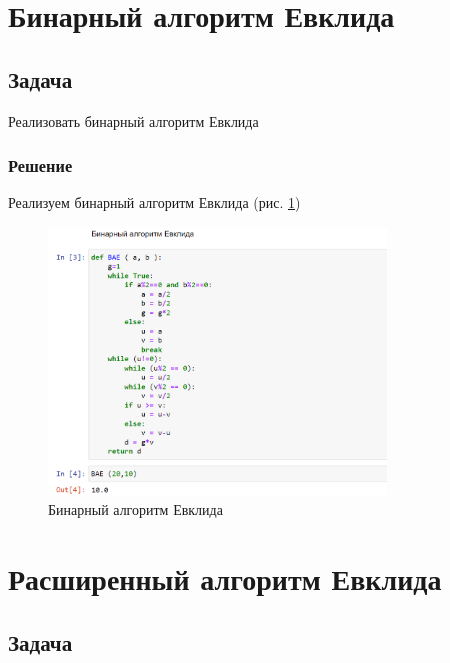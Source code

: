 \documentclass[
  12pt,
  a4paper,
]{scrreprt}
\begin{document}
\section{Бинарный алгоритм
Евклида}\label{ux431ux438ux43dux430ux440ux43dux44bux439-ux430ux43bux433ux43eux440ux438ux442ux43c-ux435ux432ux43aux43bux438ux434ux430}

\subsection{Задача}\label{ux437ux430ux434ux430ux447ux430-1}

Реализовать бинарный алгоритм Евклида

\subsubsection{Решение}\label{ux440ux435ux448ux435ux43dux438ux435-1}

Реализуем бинарный алгоритм Евклида (рис. \ref{fig:002})

\begin{figure}
\centering
\includegraphics[width=0.8\textwidth,height=\textheight]{./tex2pdf.-e48f57e5a48111ba/image/2.png}
\caption{Бинарный алгоритм Евклида}\label{fig:002}
\end{figure}

\section{Расширенный алгоритм
Евклида}\label{ux440ux430ux441ux448ux438ux440ux435ux43dux43dux44bux439-ux430ux43bux433ux43eux440ux438ux442ux43c-ux435ux432ux43aux43bux438ux434ux430}

\subsection{Задача}\label{ux437ux430ux434ux430ux447ux430-2}
\end{document}
